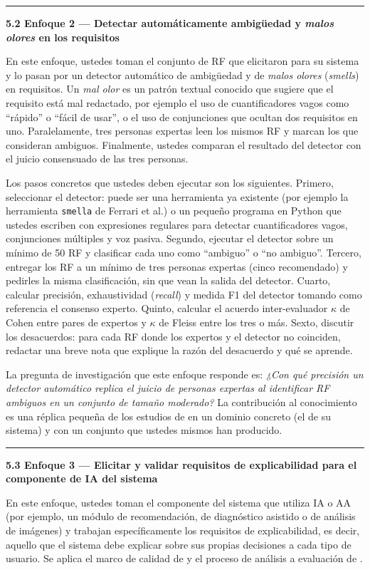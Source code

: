 \documentclass[11pt,a4paper]{article}
\newcommand{\submark}[1]{\par\vspace{4pt}\noindent
    {\color{uteqgreen}\rule[-1pt]{3.5pt}{12pt}}\hspace{6pt}\textbf{\color{uteqgreen}#1}\par\vspace{2pt}}
\begin{document}
\submark{5.2 Enfoque 2 --- Detectar automáticamente ambigüedad y \emph{malos olores} en los requisitos}
En este enfoque, ustedes toman el conjunto de RF que elicitaron para su sistema y lo pasan por un detector automático de ambigüedad y de \emph{malos olores} (\emph{smells}) en requisitos.
Un \emph{mal olor} es un patrón textual conocido que sugiere que el requisito está mal redactado, por ejemplo el uso de cuantificadores vagos como ``rápido'' o ``fácil de usar'', o el uso de conjunciones que ocultan dos requisitos en uno.
Paralelamente, tres personas expertas leen los mismos RF y marcan los que consideran ambiguos.
Finalmente, ustedes comparan el resultado del detector con el juicio consensuado de las tres personas.

Los pasos concretos que ustedes deben ejecutar son los siguientes.
Primero, seleccionar el detector: puede ser una herramienta ya existente (por ejemplo la herramienta \texttt{smella} de Ferrari et al.) o un pequeño programa en Python que ustedes escriben con expresiones regulares para detectar cuantificadores vagos, conjunciones múltiples y voz pasiva.
Segundo, ejecutar el detector sobre un mínimo de 50 RF y clasificar cada uno como ``ambiguo'' o ``no ambiguo''.
Tercero, entregar los RF a un mínimo de tres personas expertas (cinco recomendado) y pedirles la misma clasificación, sin que vean la salida del detector.
Cuarto, calcular precisión, exhaustividad (\emph{recall}) y medida F1 del detector tomando como referencia el consenso experto.
Quinto, calcular el acuerdo inter-evaluador $\kappa$ de Cohen \cite{cohen1960kappa} entre pares de expertos y $\kappa$ de Fleiss \cite{fleiss1971kappa} entre los tres o más.
Sexto, discutir los desacuerdos: para cada RF donde los expertos y el detector no coinciden, redactar una breve nota que explique la razón del desacuerdo y qué se aprende.

La pregunta de investigación que este enfoque responde es: \emph{¿Con qué precisión un detector automático replica el juicio de personas expertas al identificar RF ambiguos en un conjunto de tamaño moderado?}
La contribución al conocimiento es una réplica pequeña de los estudios de \cite{ferrari2018detecting,fischbach2023automatic} en un dominio concreto (el de su sistema) y con un conjunto que ustedes mismos han producido.

\submark{5.3 Enfoque 3 --- Elicitar y validar requisitos de explicabilidad para el componente de IA del sistema}
En este enfoque, ustedes toman el componente del sistema que utiliza IA o AA (por ejemplo, un módulo de recomendación, de diagnóstico asistido o de análisis de imágenes) y trabajan específicamente los requisitos de explicabilidad, es decir, aquello que el sistema debe explicar sobre sus propias decisiones a cada tipo de usuario.
Se aplica el marco de calidad de \cite{chazette2021exploring} y el proceso de análisis a evaluación de \cite{chazette2022explainable}.
\end{document}
